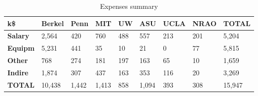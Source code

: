 

\begin{table}[h]
\centering
\caption{Expenses summary}
\label{tab:expenses}
\begin{tabular}{| p{0.5in} | p{.6in} |  p{.6in} |  p{.6in} |  p{.6in} |  p{.6in} |  p{.6in} |  p{.6in} |  p{.6in} | }\hline
  k\$   & \textbf{Berkel} & \textbf{Penn} & \textbf{MIT} & \textbf{UW} & \textbf{ASU} & \textbf{UCLA} & \textbf{NRAO} & \textbf{TOTAL}\\\hline
\textbf{Salary}&       2,564  &         420  &         760  &         488  &         557  &         213  &         201  &       5,204  \\\hline
\textbf{Equipm}&       5,231  &         441  &          35  &          10  &          21  &           0  &          77  &       5,815  \\\hline
\textbf{Other}&         768  &         274  &         181  &         197  &         163  &          65  &          10  &       1,659  \\\hline
\textbf{Indire}&       1,874  &         307  &         437  &         163  &         353  &         116  &          20  &       3,269  \\\hline
\textbf{TOTAL}&      10,438  &       1,442  &       1,413  &         858  &       1,094  &         393  &         308  &      15,947  \\\hline
\end{tabular}
\end{table}
